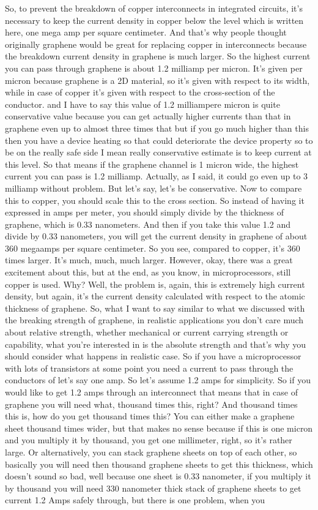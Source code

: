So, to prevent the breakdown of copper interconnects in integrated circuits, it's necessary to keep the current density in copper below the level which is written here, one mega amp per square centimeter. And that's why people thought originally graphene would be great for replacing copper in interconnects because the breakdown current density in graphene is much larger. So the highest current you can pass through graphene is about 1.2 milliamp per micron. It's given per micron because graphene is a 2D material, so it's given with respect to its width, while in case of copper it's given with respect to the cross-section of the conductor. and I have to say this value of 1.2 milliampere micron is quite conservative value because you can get actually higher currents than that in graphene even up to almost three times that but if you go much higher than this then you have a device heating so that could deteriorate the device property so to be on the really safe side I mean really conservative estimate is to keep current at this level. So that means if the graphene channel is 1 micron wide, the highest current you can pass is 1.2 milliamp. Actually, as I said, it could go even up to 3 milliamp without problem. But let's say, let's be conservative. Now to compare this to copper, you should scale this to the cross section. So instead of having it expressed in amps per meter, you should simply divide by the thickness of graphene, which is 0.33 nanometers. And then if you take this value 1.2 and divide by 0.33 nanometers, you will get the current density in graphene of about 360 megaamps per square centimeter. So you see, compared to copper, it's 360 times larger. It's much, much, much larger. However, okay, there was a great excitement about this, but at the end, as you know, in microprocessors, still copper is used. Why? Well, the problem is, again, this is extremely high current density, but again, it's the current density calculated with respect to the atomic thickness of graphene. So, what I want to say similar to what we discussed with the breaking strength of graphene, in realistic applications you don't care much about relative strength, whether mechanical or current carrying strength or capability, what you're interested in is the absolute strength and that's why you should consider what happens in realistic case. So if you have a microprocessor with lots of transistors at some point you need a current to pass through the conductors of let's say one amp. So let's assume 1.2 amps for simplicity. So if you would like to get 1.2 amps through an interconnect that means that in case of graphene you will need what, thousand times this, right? And thousand times this is, how do you get thousand times this? You can either make a graphene sheet thousand times wider, but that makes no sense because if this is one micron and you multiply it by thousand, you get one millimeter, right, so it's rather large. Or alternatively, you can stack graphene sheets on top of each other, so basically you will need then thousand graphene sheets to get this thickness, which doesn't sound so bad, well because one sheet is 0.33 nanometer, if you multiply it by thousand you will need 330 nanometer thick stack of graphene sheets to get current 1.2 Amps safely through, but there is one problem, when you 